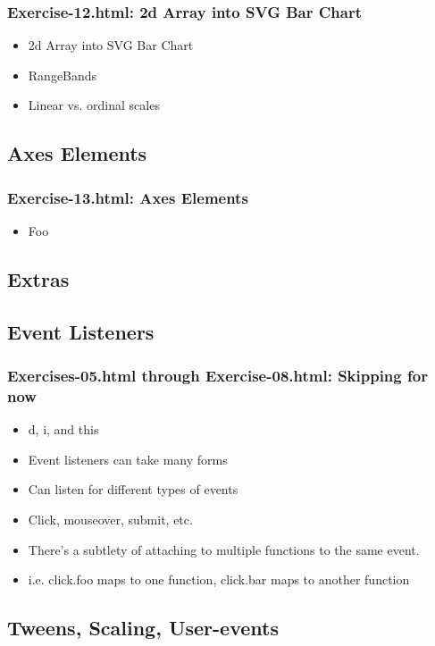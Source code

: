 \documentclass{beamer}
\begin{document}
\begin{frame}
    \frametitle{Exercise-12.html: 2d Array into SVG Bar Chart}
    \begin{itemize}
    \item 2d Array into SVG Bar Chart
    \item RangeBands
    \item Linear vs. ordinal scales
    \end{itemize}
\end{frame}



\subsection{Axes Elements}

\begin{frame}
    \frametitle{Exercise-13.html: Axes Elements}
    \begin{itemize}
    \item Foo
    \end{itemize} 
\end{frame}



\subsection{Extras}

\subsection{Event Listeners}
\begin{frame}
    \frametitle{Exercises-05.html through Exercise-08.html: Skipping for now}
    \begin{itemize}
    \item d, i, and this
    \item Event listeners can take many forms
    \item Can listen for different types of events
    \item Click, mouseover, submit, etc.
    \item There's a subtlety of attaching to multiple functions to the same event.
    \item i.e. click.foo maps to one function, click.bar maps to another function
    \end{itemize}
\end{frame}


\subsection{Tweens, Scaling, User-events}
\end{document}
